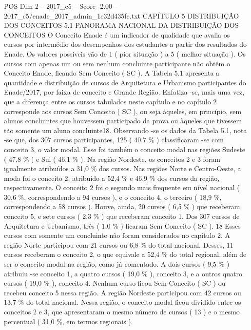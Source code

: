 \begin{textsample}{POS Dim 2 – 2017\_c5 – Score -2.00 – 2017\_c5/enade\_2017\_admin\_1e32d435fe.txt}  \label{ex:f2_pos_392}
CAPÍTULO 5 DISTRIBUIÇÃO DOS CONCEITOS 5.1 PANORAMA NACIONAL DA DISTRIBUIÇÃO DOS CONCEITOS O Conceito Enade é um indicador de qualidade que avalia os cursos por intermédio dos desempenhos dos estudantes a partir dos resultados do Enade.
Os valores possíveis vão de 1 ( pior situação ) a 5 ( melhor situação ).
Os cursos com apenas um ou sem nenhum concluinte participante não obtêm o Conceito Enade, ficando Sem Conceito ( SC ).
A Tabela 5.1 apresenta a quantidade e distribuição de cursos de Arquitetura e Urbanismo participantes do Enade/2017, por faixa de conceito e Grande Região.
Enfatiza -se, mais uma vez, que a diferença entre os cursos tabulados neste capítulo e no capítulo 2 corresponde aos cursos Sem Conceito ( SC ), ou seja àqueles, em princípio, sem alunos concluintes que houvessem participado da prova ou àqueles que tivessem tão somente um aluno concluinte18.
Observando -se os dados da Tabela 5.1, nota -se que, dos 307 cursos participantes, 125 ( 40,7 \% ) classificaram -se com conceito 3, o valor modal.
Esse foi também o conceito modal nas regiões Sudeste ( 47,8 \% ) e Sul ( 46,1 \% ).
Na região Nordeste, os conceitos 2 e 3 foram igualmente atribuídos a 31,0 \% dos cursos.
Nas regiões Norte e Centro-Oeste, a moda foi o conceito 2, atribuído a 52,4 \% e 46,9 \% dos cursos da região, respectivamente.
O conceito 2 foi o segundo mais frequente em nível nacional ( 30,6 \%, correspondendo a 94 cursos ), e o conceito 4, o terceiro ( 18,9 \%, correspondendo a 58 cursos ).
Houve, ainda, 20 cursos ( 6,5 \% ) que receberam conceito 5, e sete cursos ( 2,3 \% ) que receberam conceito 1.
Dos 307 cursos de Arquitetura e Urbanismo, três ( 1,0 \% ) ficaram Sem Conceito ( SC ). 18 Esses cursos com somente um concluinte não foram considerados no capítulo 2.
A região Norte participou com 21 cursos ou 6,8 \% do total nacional.
Desses, 11 cursos receberam o conceito 2, o que equivale a 52,4 \% do total regional, além de ser o conceito modal na região, como já comentado.
A dois cursos ( 9,5 \% ) atribuiu -se conceito 1, a quatro cursos ( 19,0 \% ), conceito 3, e a outros quatro cursos ( 19,0 \% ), conceito 4.
Nenhum curso ficou Sem Conceito ( SC ) ou recebeu conceito 5 nessa região.
A região Nordeste participou com 42 cursos ou 13,7 \% do total nacional.
Nessa região, o conceito modal ficou dividido entre os conceitos 2 e 3, que apresentaram o mesmo número de cursos ( 13 ) e o mesmo percentual ( 31,0 \%, em termos regionais ).

\end{textsample}
